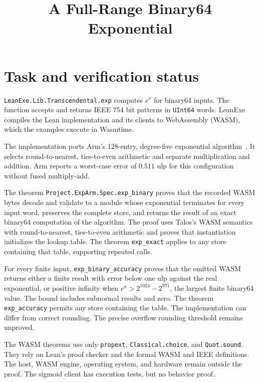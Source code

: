 
\title{A Full-Range Binary64 Exponential}

\maketitle

\section{Task and verification status}
\texttt{LeanExe.Lib.Transcendental.exp} computes $e^x$ for binary64 inputs.
The function accepts and returns IEEE 754 bit patterns in \texttt{UInt64}
words.  LeanExe compiles the Lean implementation and its clients to
WebAssembly (WASM), which the examples execute in Wasmtime.

The implementation ports Arm's 128-entry, degree-five exponential
algorithm~\cite{arm,data}.  It selects round-to-nearest, ties-to-even
arithmetic and separate multiplication and addition.  Arm reports a
worst-case error of $0.511$ ulp for this configuration without fused
multiply-add.

The theorem \texttt{Project.ExpArm.Spec.exp\_binary} proves that the recorded
WASM bytes decode and validate to a module whose exponential terminates for
every input word, preserves the complete store, and returns the result of an
exact binary64 computation of the algorithm.  The proof uses Talos's WASM
semantics with round-to-nearest, ties-to-even arithmetic and proves that
instantiation initializes the lookup table.  The theorem \texttt{exp\_exact}
applies to any store containing that table, supporting repeated calls.

For every finite input, \texttt{exp\_binary\_accuracy} proves that the emitted
WASM returns either a finite result with error below one ulp against the real
exponential, or positive infinity when $e^x>2^{1024}-2^{971}$, the largest
finite binary64 value.  The bound includes subnormal results and zero.
The theorem \texttt{exp\_accuracy} permits any store containing the table.
The implementation can differ from correct rounding.  The precise overflow
rounding threshold remains unproved.

The WASM theorems use only \texttt{propext}, \texttt{Classical.choice}, and
\texttt{Quot.sound}.  They rely on Lean's proof checker and the formal WASM
and IEEE definitions.  The host, WASM engine, operating system, and hardware
remain outside the proof.  The sigmoid client has execution tests, but no
behavior proof.

